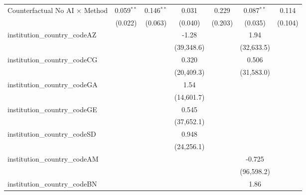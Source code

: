 \begin{tabular}{lcccccc}
   Counterfactual No AI $\times$ Method  & 0.059$^{**}$   & 0.146$^{**}$  & 0.031          & 0.229          & 0.087$^{**}$   & 0.114\\   
                                         & (0.022)        & (0.063)       & (0.040)        & (0.203)        & (0.035)        & (0.104)\\   
   institution\_country\_codeAZ          &                &               & -1.28          &                & 1.94           &   \\   
                                         &                &               & (39,348.6)     &                & (32,633.5)     &   \\   
   institution\_country\_codeCG          &                &               & 0.320          &                & 0.506          &   \\   
                                         &                &               & (20,409.3)     &                & (31,583.0)     &   \\   
   institution\_country\_codeGA          &                &               & 1.54           &                &                &   \\   
                                         &                &               & (14,601.7)     &                &                &   \\   
   institution\_country\_codeGE          &                &               & 0.545          &                &                &   \\   
                                         &                &               & (37,652.1)     &                &                &   \\   
   institution\_country\_codeSD          &                &               & 0.948          &                &                &   \\   
                                         &                &               & (24,256.1)     &                &                &   \\   
   institution\_country\_codeAM          &                &               &                &                & -0.725         &   \\   
                                         &                &               &                &                & (96,598.2)     &   \\   
   institution\_country\_codeBN          &                &               &                &                & 1.86           &   \\   

\end{tabular}
